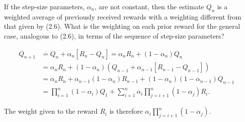 
\begin{exercise}[Exercise 2.4]

If the step-size parameters, $\alpha_n$, are not constant, then the estimate $Q_n$
is a weighted average of previously received rewards with a weighting different
from that given by (2.6). What is the weighting on each prior reward for the
general case, analogous to (2.6), in terms of the sequence of step-size parameters?

\end{exercise}


\begin{solution}

\begin{align*}
  Q_{n+1} &\stackrel{\cdot}{=} Q_n + \alpha_n[R_n - Q_n]
  = \alpha_n R_n + (1 - \alpha_n)Q_n \\
  &= \alpha_n R_n + (1 - \alpha_n)(Q_{n-1} + 
  \alpha_{n-1}[R_{n-1} - Q_{n-1}]) \\
  &= \alpha_n R_n + \alpha_{n-1}(1 - \alpha_n) R_{n-1} + (1 - \alpha_n)(1 - \alpha_{n-1})Q_{n-1} \\
  &= \prod_{i=1}^n (1 - \alpha_i)Q_1 + \sum_{i=1}^n \alpha_i
  \prod_{j = i+1}^n (1 - \alpha_j) R_i.
\end{align*}

The weight given to the reward $R_i$ is therefore $\alpha_i\prod_{j = i+1}^n (1 - \alpha_j)$.
\end{solution}

